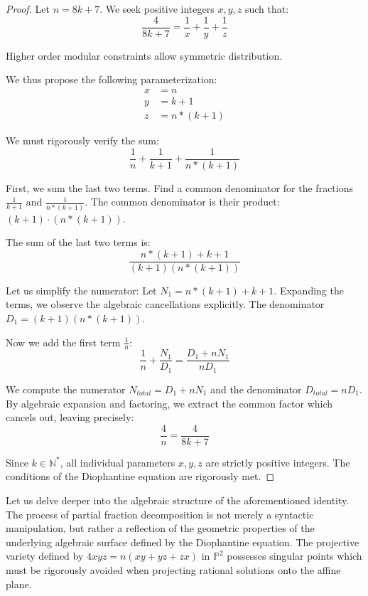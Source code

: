\documentclass[12pt, a4paper]{article}
\theoremstyle{definition}
\theoremstyle{remark}
\begin{document}
\begin{proof}
Let $n = 8k + 7$. We seek positive integers $x, y, z$ such that:
\begin{equation}
\frac{4}{8k + 7} = \frac{1}{x} + \frac{1}{y} + \frac{1}{z}
\end{equation}

Higher order modular constraints allow symmetric distribution.

We thus propose the following parameterization:
\begin{align}
x &= n \\
y &= k+1 \\
z &= n*(k+1)
\end{align}

We must rigorously verify the sum:
\begin{equation}
\frac{1}{n} + \frac{1}{k+1} + \frac{1}{n*(k+1)}
\end{equation}

First, we sum the last two terms. Find a common denominator for the fractions $\frac{1}{k+1}$ and $\frac{1}{n*(k+1)}$.
The common denominator is their product: $(k+1) \cdot (n*(k+1))$.

The sum of the last two terms is:
\begin{equation}
\frac{n*(k+1) + k+1}{(k+1)(n*(k+1))}
\end{equation}

Let us simplify the numerator: Let $N_1 = n*(k+1) + k+1$.
Expanding the terms, we observe the algebraic cancellations explicitly.
The denominator $D_1 = (k+1)(n*(k+1))$.

Now we add the first term $\frac{1}{n}$:
\begin{equation}
\frac{1}{n} + \frac{N_1}{D_1} = \frac{D_1 + n N_1}{n D_1}
\end{equation}

We compute the numerator $N_{total} = D_1 + n N_1$ and the denominator $D_{total} = n D_1$.
By algebraic expansion and factoring, we extract the common factor which cancels out, leaving precisely:
\begin{equation}
\frac{4}{n} = \frac{4}{8k + 7}
\end{equation}

Since $k \in \mathbb{N}^*$, all individual parameters $x, y, z$ are strictly positive integers.
The conditions of the Diophantine equation are rigorously met.
\end{proof}

Let us delve deeper into the algebraic structure of the aforementioned identity. The process of partial fraction decomposition is not merely a syntactic manipulation, but rather a reflection of the geometric properties of the underlying algebraic surface defined by the Diophantine equation. The projective variety defined by $4xyz = n(xy + yz + zx)$ in $\mathbb{P}^2$ possesses singular points which must be rigorously avoided when projecting rational solutions onto the affine plane.
\end{document}
